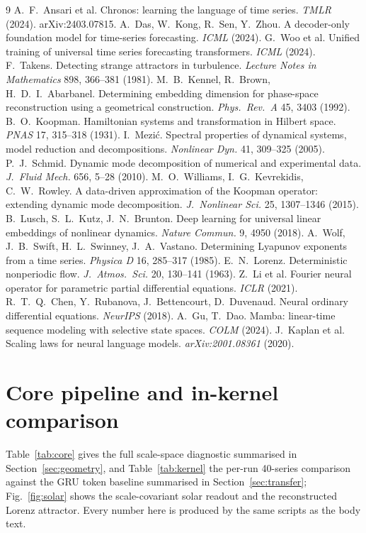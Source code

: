 \documentclass{article}
\begin{document}
\begin{thebibliography}{9}
 A.~F.~Ansari et al. Chronos: learning the language of
time series. \emph{TMLR} (2024). arXiv:2403.07815.
 A.~Das, W.~Kong, R.~Sen, Y.~Zhou. A decoder-only
foundation model for time-series forecasting. \emph{ICML} (2024).
 G.~Woo et al. Unified training of universal time series
forecasting transformers. \emph{ICML} (2024).
 F.~Takens. Detecting strange attractors in turbulence.
\emph{Lecture Notes in Mathematics} 898, 366--381 (1981).
 M.~B.~Kennel, R.~Brown, H.~D.~I.~Abarbanel. Determining
embedding dimension for phase-space reconstruction using a geometrical
construction. \emph{Phys.\ Rev.\ A} 45, 3403 (1992).
 B.~O.~Koopman. Hamiltonian systems and transformation in
Hilbert space. \emph{PNAS} 17, 315--318 (1931).
 I.~Mezi\'c. Spectral properties of dynamical systems,
model reduction and decompositions. \emph{Nonlinear Dyn.} 41, 309--325 (2005).
 P.~J.~Schmid. Dynamic mode decomposition of numerical and
experimental data. \emph{J.\ Fluid Mech.} 656, 5--28 (2010).
 M.~O.~Williams, I.~G.~Kevrekidis, C.~W.~Rowley. A
data-driven approximation of the Koopman operator: extending dynamic mode
decomposition. \emph{J.\ Nonlinear Sci.} 25, 1307--1346 (2015).
 B.~Lusch, S.~L.~Kutz, J.~N.~Brunton. Deep learning for
universal linear embeddings of nonlinear dynamics. \emph{Nature Commun.} 9,
4950 (2018).
 A.~Wolf, J.~B.~Swift, H.~L.~Swinney, J.~A.~Vastano.
Determining Lyapunov exponents from a time series. \emph{Physica D} 16,
285--317 (1985).
 E.~N.~Lorenz. Deterministic nonperiodic flow.
\emph{J.\ Atmos.\ Sci.} 20, 130--141 (1963).
 Z.~Li et al. Fourier neural operator for parametric partial
differential equations. \emph{ICLR} (2021).
 R.~T.~Q.~Chen, Y.~Rubanova, J.~Bettencourt, D.~Duvenaud.
Neural ordinary differential equations. \emph{NeurIPS} (2018).
 A.~Gu, T.~Dao. Mamba: linear-time sequence modeling with
selective state spaces. \emph{COLM} (2024).
 J.~Kaplan et al. Scaling laws for neural language models.
\emph{arXiv:2001.08361} (2020).
\end{thebibliography}

\newpage
\appendix
\section{Core pipeline and in-kernel comparison}
\label{app:tables}
Table~\ref{tab:core} gives the full scale-space diagnostic summarised in
Section~\ref{sec:geometry}, and Table~\ref{tab:kernel} the per-run 40-series
comparison against the GRU token baseline summarised in
Section~\ref{sec:transfer}; Fig.~\ref{fig:solar} shows the scale-covariant solar
readout and the reconstructed Lorenz attractor. Every number here is produced
by the same scripts as the body text.
\end{document}
